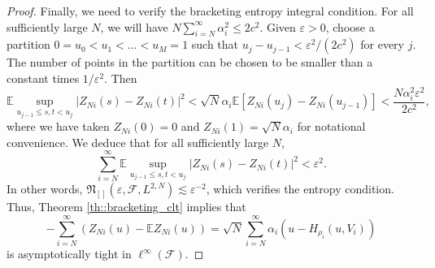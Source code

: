 \documentclass[11pt,a4paper]{article}
\newcommand{\E}{\mathbb{E}}
\begin{document}
\begin{appendices}
\begin{proof}
Finally, we need to verify the bracketing entropy integral condition. For all sufficiently large $N$, we will have $N\sum_{i=N}^{\infty} \alpha_{i}^{2} \leq 2c^{2}$. Given $\varepsilon > 0$, choose a partition $0 = u_{0} < u_{1} < \ldots   < u_{M} = 1$ such that $u_{j} - u_{j-1} < \varepsilon^{2}/(2c^{2})$ for every $j$. The number of points in the partition can be chosen to be smaller than a constant times $1/\varepsilon^{2}$. Then
\begin{equation*}
    \E \sup_{u_{j-1} \leq s,t < u_{j}} |Z_{Ni}(s) - Z_{Ni}(t)|^{2} < \sqrt{N}\alpha_{i}\E[Z_{Ni}(u_{j}) - Z_{Ni}(u_{j-1})] < \frac{N \alpha_{i}^{2}\varepsilon^{2}}{2c^{2}},
\end{equation*}
where we have taken $Z_{Ni}(0) = 0$ and $Z_{Ni}(1) = \sqrt{N}\alpha_{i}$ for notational convenience. We deduce that for all sufficiently large $N$,
\begin{equation*}
    \sum_{i=N}^{\infty}\E \sup_{u_{j-1} \leq s,t < u_{j}} |Z_{Ni}(s) - Z_{Ni}(t)|^{2} < \varepsilon^{2}.
\end{equation*}
In other words, $\mathfrak{N}_{[]}(\varepsilon, \mathcal{F}, L^{2,N}) \lesssim {\varepsilon^{-2}}$, which verifies the entropy condition. Thus, {Theorem \ref{th::bracketing_clt}} implies that
\begin{equation*}
    -\sum_{i=N}^{\infty} (Z_{Ni}(u) -\E Z_{Ni}(u)) = \sqrt{N}\sum_{i=N}^{\infty}\alpha_{i}(u - H_{\rho_{i}}(u,V_{i}))
\end{equation*}
is asymptotically tight in $\ell^{\infty}(\mathcal{F})$.
\end{proof}


\end{appendices}
\end{document}
